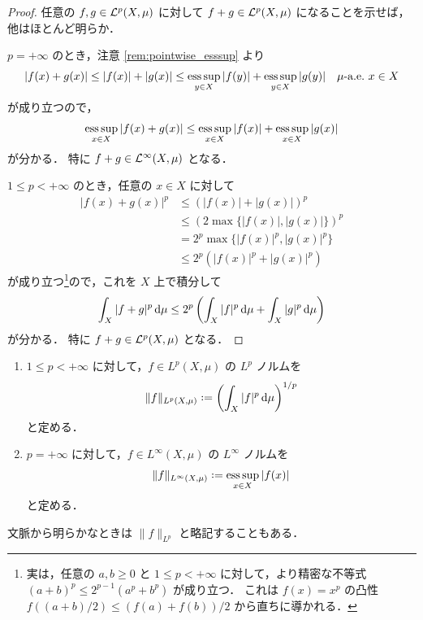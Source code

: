 \begin{proof}
    任意の $f,g\in\mathcal{L}^p(X,\mu)$ に対して $f+g\in\mathcal{L}^p(X,\mu)$ になることを示せば，他はほとんど明らか．

    $p=+\infty$ のとき，注意 \ref{rem:pointwise_esssup} より
    \begin{align*}
        |f(x)+g(x)|
        \le|f(x)|+|g(x)|
        \le\operatorname*{ess\,sup}_{y\in X}|f(y)|+\operatorname*{ess\,sup}_{y\in X}|g(y)|\quad\text{$\mu$-a.e.\ $x\in X$}
    \end{align*}
    が成り立つので，
    \begin{align}
        \operatorname*{ess\,sup}_{x\in X}|f(x)+g(x)|\le\operatorname*{ess\,sup}_{x\in X}|f(x)|+\operatorname*{ess\,sup}_{x\in X}|g(x)|
        \label{eqn:esssup_triangle}
    \end{align}
    が分かる．
    特に $f+g\in\mathcal{L}^\infty(X,\mu)$ となる．

    $1\le p<+\infty$ のとき，任意の $x\in X$ に対して
    \begin{align*}
        |f(x)+g(x)|^p
        &\le(|f(x)|+|g(x)|)^p\\
        &\le(2\max\{|f(x)|,|g(x)|\})^p\\
        &=2^p\max\{|f(x)|^p,|g(x)|^p\}\\
        &\le2^p(|f(x)|^p+|g(x)|^p)
    \end{align*}
    が成り立つ\footnote{
        実は，任意の $a,b\ge0$ と $1\le p<+\infty$ に対して，より精密な不等式 $(a+b)^p\le2^{p-1}(a^p+b^p)$ が成り立つ．
        これは $f(x)=x^p$ の凸性 $f((a+b)/2)\le(f(a)+f(b))/2$ から直ちに導かれる．
    }ので，これを $X$ 上で積分して
    \begin{align*}
        \int_X|f+g|^p\,\mathrm{d}\mu
        \le2^p\left(\int_X|f|^p\,\mathrm{d}\mu+\int_X|g|^p\,\mathrm{d}\mu\right)
    \end{align*}
    が分かる．
    特に $f+g\in\mathcal{L}^p(X,\mu)$ となる．
\end{proof}

\begin{definition}\label{def:Lp_norm}
    \leavevmode
    \begin{enumerate}
        \item
            $1\le p<+\infty$ に対して，$f\in L^p(X,\mu)$ の $L^p$ ノルムを
            \begin{align*}
                \|f\|_{L^p(X,\mu)}\defeq\left(\int_X|f|^p\,\drm\mu\right)^{1/p}
            \end{align*}
            と定める．
        \item
            $p=+\infty$ に対して，$f\in L^\infty(X,\mu)$ の $L^\infty$ ノルムを
            \begin{align*}
                \|f\|_{L^\infty(X,\mu)}\defeq\esssup_{x\in X}|f(x)|
            \end{align*}
            と定める．
    \end{enumerate}
    文脈から明らかなときは $\|f\|_{L^p}$ と略記することもある．
\end{definition}

